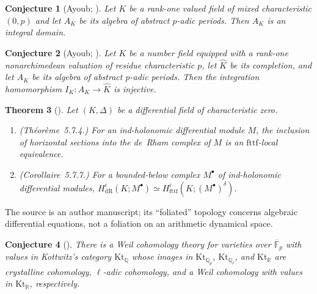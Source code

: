 \documentclass[11pt]{amsart}
\theoremstyle{plain}
\newtheorem{theorem}{Theorem}[section]
\newtheorem{conjecture}[theorem]{Conjecture}
\theoremstyle{definition}
\theoremstyle{remark}
\numberwithin{equation}{section}
\newcommand{\R}{\mathbb{R}}
\newcommand{\Q}{\mathbb{Q}}
\newcommand{\F}{\mathbb{F}}
\begin{document}
\begin{conjecture}[{Ayoub;
\cite[Remarque~1.6, p.~1750]{Ayoub2020NewWeil}}]
\label{conj:ayoub-period-domain}
Let $K$ be a rank-one valued field of mixed characteristic $(0,p)$
and let $A_K$ be its algebra of abstract $p$-adic periods.
Then $A_K$ is an integral domain.
\end{conjecture}

\begin{conjecture}[{Ayoub;
\cite[Remarque~1.6, p.~1750]{Ayoub2020NewWeil}}]
\label{conj:ayoub-period-integration}
Let $K$ be a number field equipped with a rank-one nonarchimedean
valuation of residue characteristic $p$, let $\widehat K$ be its
completion, and let $A_K$ be its algebra of abstract $p$-adic
periods. Then the integration homomorphism
$I_K:A_K\to\widehat K$ is injective.
\end{conjecture}


\begin{theorem}[{\cite[Th\'eor\`eme~5.7.4 and Corollaire~5.7.7,
pp.~187--188]{Ayoub2019FoliatedDGalois}}]\label{thm:imp-a19}
Let $(K,\Delta)$ be a differential field of characteristic zero.
\begin{enumerate}[label=(\roman*)]
\item (Th\'eor\`eme~5.7.4.) For an ind-holonomic differential module
  $M$, the inclusion of horizontal sections into the de~Rham complex of
  $M$ is an $\mathrm{fttf}$-local equivalence.
\item (Corollaire~5.7.7.) For a bounded-below complex $M^\bullet$ of
  ind-holonomic differential modules,
  $H^i_{\mathrm{dR}}(K;M^\bullet)\simeq H^i_{\mathrm{fttf}}(K;
  (M^\bullet)^\delta)$.
\end{enumerate}
\end{theorem}

The source is an author manuscript; its ``foliated'' topology concerns
algebraic differential equations, not a foliation on an arithmetic
dynamical space.

\begin{conjecture}[{\cite[Conjecture~9.5, pp.~24--25]%
{Scholze2018PadicGeometry}}]\label{conj:imp-s18}
There is a Weil cohomology theory for varieties over $\overline{\F}_p$
with values in Kottwitz's category $\mathrm{Kt}_\Q$ whose images in
$\mathrm{Kt}_{\Q_p}$, $\mathrm{Kt}_{\Q_\ell}$, and $\mathrm{Kt}_\R$ are
crystalline cohomology, $\ell$-adic cohomology, and a Weil cohomology
with values in $\mathrm{Kt}_\R$, respectively.
\end{conjecture}
\end{document}
